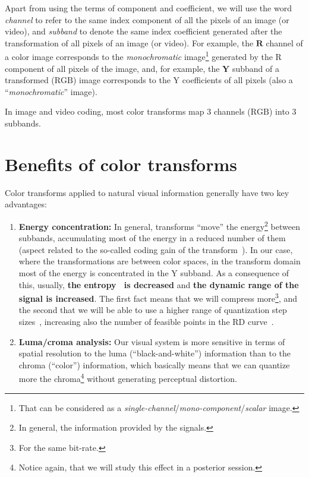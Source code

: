 Apart from using the terms of component and coefficient, we will use
the word \emph{channel} to refer to the same index component of all
the pixels of an image (or video), and \emph{subband} to denote the
same index coefficient generated after the transformation of all
pixels of an image (or video). For example, the $\mathbf{R}$ channel
of a color image corresponds to the \emph{monochromatic}
image\footnote{That can be considered as a
  \emph{single-channel}/\emph{mono-component}/\emph{scalar} image.}
generated by the $\text{R}$ component of all pixels of the image, and,
for example, the $\mathbf{Y}$ subband of a transformed ($\text{RGB}$)
image corresponds to the $\text{Y}$ coefficients of all pixels (also a
``\emph{monochromatic}'' image).

In image and video coding, most color transforms map 3 channels
($\text{RGB}$) into 3 subbands.

\section{Benefits of color transforms}

Color transforms applied to natural visual information generally have
two key advantages:
\begin{enumerate}
\item \textbf{Energy concentration:} In general, transforms ``move''
  the energy\footnote{In general, the information provided by the
    signals.} between subbands, accumulating most of the energy in a
  reduced number of them (aspect related to the so-called coding gain
  of the transform~\cite{vruiz__transform_coding}). In our case, where
  the transformations are between color spaces, in the transform
  domain most of the energy is concentrated in the $\text{Y}$
  subband. As a consequence of this, usually, \textbf{the
    entropy~\cite{vruiz__information_theory} is decreased} and
  \textbf{the dynamic range of the signal is increased}. The first
  fact means that we will compress more\footnote{For the same
    bit-rate.}, and the second that we will be able to use a higher
  range of quantization step
  sizes~\cite{vruiz__scalar_quantization,sayood2017introduction},
  increasing also the number of feasible points in the RD
  curve~\cite{vruiz__information_theory}.
\item \textbf{Luma/croma analysis:} Our visual system is more
  sensitive in terms of spatial resolution to the luma
  (``black-and-white'') information than to the chroma (``color'')
  information, which basically means that we can quantize more the
  chroma\footnote{Notice again, that we will study this effect in a
  posterior session.} without generating perceptual distortion. 
\end{enumerate}

